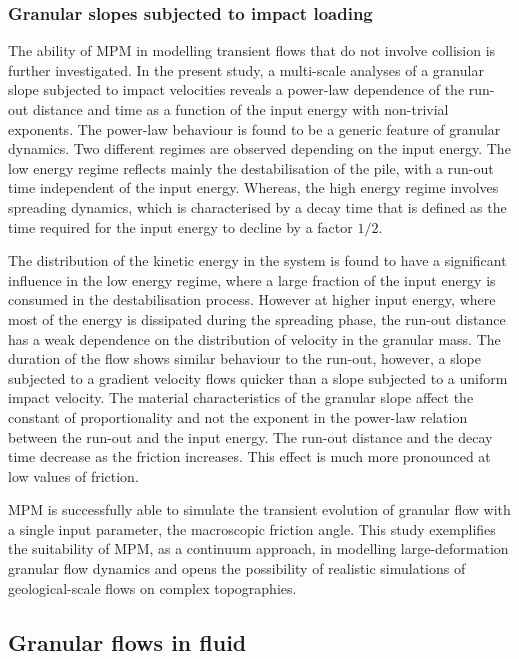 \subsubsection*{Granular slopes subjected to impact loading}

The ability of MPM in modelling transient flows that do not involve collision 
is further investigated. In the 
present study, a multi-scale analyses of a granular slope subjected to 
impact velocities reveals a power-law dependence of the run-out distance and 
time as a function of the input energy with non-trivial exponents. The 
power-law behaviour is found to be a generic feature of granular dynamics. Two 
different regimes are observed depending on the input energy. The low energy 
regime reflects mainly the destabilisation of the pile, with a run-out time 
independent of the input energy. Whereas, the high energy regime involves 
spreading dynamics, which is characterised by a decay time that is defined as 
the time required for the input energy to  decline by a factor $1/2$.


The distribution of the kinetic energy in the system is found to have a 
significant influence in the low energy regime, where a large 
fraction of the input energy is consumed in the destabilisation process. 
However at higher input energy, where most of the energy is dissipated during 
the spreading phase, the run-out distance has a weak dependence on 
the distribution of velocity in the granular mass. The duration of the flow 
shows similar behaviour to the run-out, however, a slope subjected to a 
gradient velocity flows quicker than a slope subjected to a uniform
impact velocity. The material characteristics of the granular slope affect the 
constant of proportionality and not the exponent in the power-law relation 
between the run-out and the input energy. The run-out distance and the decay 
time decrease as the friction increases. This effect is much more pronounced at 
low values of friction. 

MPM is successfully able to simulate the transient evolution of granular flow 
with a single input parameter, the macroscopic friction angle. This study 
exemplifies the suitability of MPM, as a continuum approach, in modelling 
large-deformation granular flow dynamics and opens the possibility of realistic 
simulations of geological-scale flows on complex topographies.

\subsection{Granular flows in fluid}

